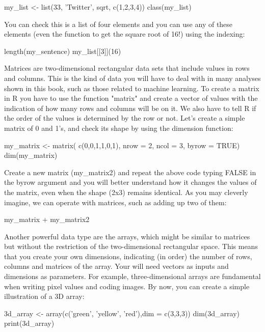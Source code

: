 \begin{exampler}
my_list <- list(33, 'Twitter', sqrt, c(1,2,3,4))
class(my_list)
\end{exampler}

You can check this is a list of four elements and you can use any of these elements (even the function to get the square root of 16!) using the indexing:

\begin{exampler}
length(my_sentence)
my_list[[3]](16)
\end{exampler}

Matrices are two-dimensional rectangular data sets that include values in rows and columns. This is the kind of data you will have to deal with in many analyses shown in this book, such as those related to machine learning.  To create a matrix in R you have to use the function "matrix" and create a vector of values with the indication of how many rows and columns will be on it. We also have to tell R if the order of the values is determined by the row or not.  Let’s create a simple matrix of 0 and 1’s, and check its shape by using the dimension function:

\begin{exampler}
my_matrix <- matrix( c(0,0,1,1,0,1), nrow = 2, ncol = 3, byrow = TRUE)
dim(my_matrix)
\end{exampler}

Create a new matrix (my\_matrix2) and repeat the above code typing FALSE in the byrow argument and you will better understand how it changes the values of the matrix, even when the shape (2x3) remains identical. As you may cleverly imagine, we can operate with matrices, such as adding up two of them:

\begin{exampler}
my_matrix + my_matrix2
\end{exampler}

Another powerful data type are the arrays, which might be similar to matrices but without the restriction of the two-dimensional rectangular space. This means that you create your own dimensions, indicating (in order) the number of rows, columns and matrices of the array. Your will need vectors as inputs and dimensions as parameters. For example, three-dimensional arrays are fundamental when writing pixel values and coding images.  By now, you can create a simple illustration of a 3D array:

\begin{exampler}
3d_array <- array(c('green', 'yellow', 'red'),dim = c(3,3,3))
dim(3d_array)
print(3d_array)
\end{exampler}


